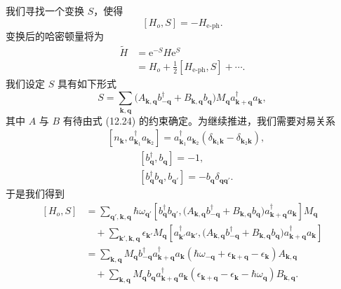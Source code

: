 我们寻找一个变换 $S$，使得
\begin{equation*}
\left[H_{o},S\right]=-H_{\mathrm{e}\text{-}\mathrm{ph}}.\tag{12.24}
\end{equation*}
变换后的哈密顿量将为
\begin{align*}
\tilde{H}&=\mathrm{e}^{-S}H\mathrm{e}^{S}\\
&=H_{o}+\frac{1}{2}\left[H_{\mathrm{e}\text{-}\mathrm{ph}},S\right]+\cdots.\tag{12.25}
\end{align*}
我们设定 $S$ 具有如下形式
\begin{equation*}
S=\sum_{\mathbf{k},\mathbf{q}}\bigl(A_{\mathbf{k},\mathbf{q}}b_{-\mathbf{q}}^{\dagger}+B_{\mathbf{k},\mathbf{q}}b_{\mathbf{q}}\bigr)M_{\mathbf{q}}a_{\mathbf{k}+\mathbf{q}}^{\dagger}a_{\mathbf{k}},\tag{12.26}
\end{equation*}
其中 $A$ 与 $B$ 有待由式 (12.24) 的约束确定。为继续推进，我们需要对易关系
\begin{align*}
&\left[n_{\mathbf{k}},a_{\mathbf{k}_{1}}^{\dagger}a_{\mathbf{k}_{2}}\right]=a_{\mathbf{k}_{1}}^{\dagger}a_{\mathbf{k}_{2}}\left(\delta_{\mathbf{k}_{1}\mathbf{k}}-\delta_{\mathbf{k}_{2}\mathbf{k}}\right),\\
&\qquad\quad\ \left[b_{\mathbf{q}}^{\dagger},b_{\mathbf{q}}\right]=-1,\\
&\qquad\quad\ \left[b_{\mathbf{q}}^{\dagger}b_{\mathbf{q}},b_{\mathbf{q}'}\right]=-b_{\mathbf{q}}\delta_{\mathbf{q}\mathbf{q}'}.\tag{12.27}
\end{align*}
于是我们得到
\begin{align*}
\left[H_{o},S\right]&=\sum_{\mathbf{q}',\mathbf{k},\mathbf{q}}\hbar\omega_{\mathbf{q}'}\left[b_{\mathbf{q}}^{\dagger}b_{\mathbf{q}'},\bigl(A_{\mathbf{k},\mathbf{q}}b_{-\mathbf{q}}^{\dagger}+B_{\mathbf{k},\mathbf{q}}b_{\mathbf{q}}\bigr)a_{\mathbf{k}+\mathbf{q}}^{\dagger}a_{\mathbf{k}}\right]M_{\mathbf{q}}\\
&\quad+\sum_{\mathbf{k}',\mathbf{k},\mathbf{q}}\epsilon_{\mathbf{k}'}M_{\mathbf{q}}\left[a_{\mathbf{k}'}^{\dagger}a_{\mathbf{k}'},\bigl(A_{\mathbf{k},\mathbf{q}}b_{-\mathbf{q}}^{\dagger}+B_{\mathbf{k},\mathbf{q}}b_{\mathbf{q}}\bigr)a_{\mathbf{k}+\mathbf{q}}^{\dagger}a_{\mathbf{k}}\right]\\
&=\sum_{\mathbf{k},\mathbf{q}}M_{\mathbf{q}}b_{-\mathbf{q}}^{\dagger}a_{\mathbf{k}+\mathbf{q}}^{\dagger}a_{\mathbf{k}}\left(\hbar\omega_{-\mathbf{q}}+\epsilon_{\mathbf{k}+\mathbf{q}}-\epsilon_{\mathbf{k}}\right)A_{\mathbf{k},\mathbf{q}}\\
&\quad+\sum_{\mathbf{k},\mathbf{q}}M_{\mathbf{q}}b_{\mathbf{q}}a_{\mathbf{k}+\mathbf{q}}^{\dagger}a_{\mathbf{k}}\left(\epsilon_{\mathbf{k}+\mathbf{q}}-\epsilon_{\mathbf{k}}-\hbar\omega_{\mathbf{q}}\right)B_{\mathbf{k},\mathbf{q}}.\tag{12.28}
\end{align*}
